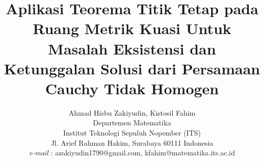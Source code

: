 \documentclass[journal]{IEEEtran}
\theoremstyle{definition}
\theoremstyle{definition}
\theoremstyle{plain}
\begin{document}
    \title{Aplikasi Teorema Titik Tetap pada Ruang Metrik Kuasi Untuk Masalah Eksistensi dan Ketunggalan Solusi dari Persamaan Cauchy Tidak Homogen\\ \vspace{12pt}}
    
    \author{Ahmad Hisbu Zakiyudin, Kistosil Fahim\\
    Departemen Matematika\\Institut Teknologi Sepuluh Nopember (ITS)\\
    Jl. Arief Rahman Hakim, Surabaya 60111 Indonesia\\
    \textit{e-mail} : azakiyudin1790@gmail.com, 	kfahim@matematika.its.ac.id\\ \vspace{-1em}}
    
    
\end{document}
